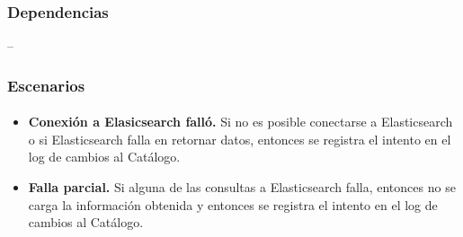 \subsubsection*{Dependencias}
--



\subsubsection*{Escenarios}
\paragraph{}

\begin{itemize}
    \item
        {\bf Conexi\'on a Elasicsearch fall\'o.}
        Si no es posible conectarse a Elasticsearch
        o si Elasticsearch falla en retornar datos,
        entonces se registra el intento en el log de cambios al Cat\'alogo.
    \item
        {\bf Falla parcial.}
        Si alguna de las consultas a Elasticsearch falla, 
        entonces no se carga la informaci\'on obtenida y 
        entonces se registra el intento en el log de cambios al Cat\'alogo.
\end{itemize}



